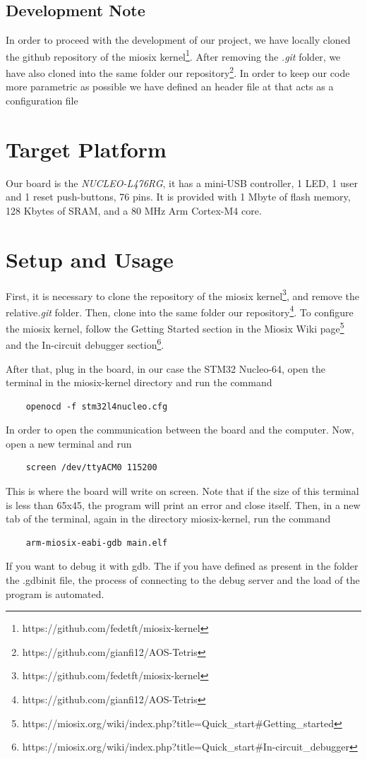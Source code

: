 \documentclass{article}
\begin{document}
\subsection{Development Note}
In order to proceed with the development of our project, we have locally cloned the github repository of the miosix kernel\footnote{https://github.com/fedetft/miosix-kernel}.
After removing the \emph{.git} folder, we have also cloned into the same folder our repository\footnote{https://github.com/gianfi12/AOS-Tetris}.
In order to keep our code more parametric as possible we have defined an header file at  that acts as a configuration file

\section{Target Platform}
Our board is the \emph{NUCLEO-L476RG}, it has a mini-USB controller, 1 LED, 1 user and 1 reset push-buttons, 76 pins.
It is provided with 1 Mbyte of flash memory, 128 Kbytes of SRAM, and a 80 MHz Arm Cortex-M4 core.

\section{Setup and Usage}
First, it is necessary to clone the repository of the miosix kernel\footnote{https://github.com/fedetft/miosix-kernel}, and remove the relative\emph{.git} folder.\newline
Then, clone into the same folder our repository\footnote{https://github.com/gianfi12/AOS-Tetris}.\newline
To configure the miosix kernel, follow the Getting Started section in the Miosix Wiki page\footnote{https://miosix.org/wiki/index.php?title=Quick\_start\#Getting\_started} 
and the In-circuit debugger section\footnote{https://miosix.org/wiki/index.php?title=Quick\_start\#In-circuit\_debugger}.\newline

After that, plug in the board, in our case the STM32 Nucleo-64, open the terminal in the miosix-kernel directory and run the command
\begin{verbatim}
    openocd -f stm32l4nucleo.cfg
\end{verbatim}
In order to open the communication between the board and the computer.\newline
Now, open a new terminal and run
\begin{verbatim}
    screen /dev/ttyACM0 115200
\end{verbatim}
This is where the board will write on screen. Note that if the size of this terminal is less than 65x45, the program will print an error and close itself.
Then, in a new tab of the terminal, again in the directory miosix-kernel, run the command
\begin{verbatim}
    arm-miosix-eabi-gdb main.elf
\end{verbatim}
If you want to debug it with gdb. The if you have defined as present in the folder the .gdbinit file, the process of connecting to the debug server and the load of the program is automated.
\end{document}
